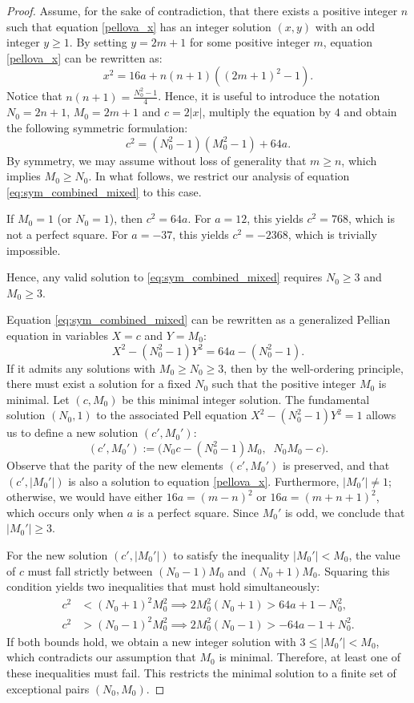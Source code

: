 \documentclass[10pt,a4paper]{amsart}
\begin{document}
\begin{proof}
Assume, for the sake of contradiction, that there exists a positive integer $n$ such that equation \eqref{pellova_x} has an integer solution $(x, y)$ with an odd integer $y \ge 1$. 
By setting $y = 2m+1$ for some positive integer $m$, equation \eqref{pellova_x} can be rewritten as:
$$ x^2 = 16a + n(n+1)((2m+1)^2-1). $$
Notice that $n(n+1) = \frac{N_0^2-1}{4}$. Hence, it is useful to introduce the notation $N_0 = 2n+1$, $M_0 = 2m+1$ and $c = 2|x|$, multiply the equation by $4$ and obtain the following symmetric formulation:
\begin{equation} \label{eq:sym_combined_mixed}
c^2 = (N_0^2-1)(M_0^2-1) + 64a.
\end{equation}
By symmetry, we may assume without loss of generality that $m \geq n$, which implies $M_0 \geq N_0$. In what follows, we restrict our analysis of equation \eqref{eq:sym_combined_mixed} to this case.

If $M_0 = 1$ (or $N_0 = 1$), then  $c^2 = 64a$. 
 For $a=12$, this yields $c^2 = 768$, which is not a perfect square.
    For $a=-37$, this yields $c^2 = -2368$, which is trivially impossible.

Hence, any valid solution to \eqref{eq:sym_combined_mixed} requires $N_0 \ge 3$ and $M_0 \ge 3$. 

Equation \eqref{eq:sym_combined_mixed} can be rewritten as a generalized Pellian equation in variables $X=c$ and $Y=M_0$:
$$ X^2 - (N_0^2-1)Y^2 = 64a - (N_0^2-1). $$
If it admits any solutions with $M_0 \ge N_0 \ge 3$, then by the well-ordering principle, there must exist a solution for a fixed $N_0$ such that the positive integer $M_0$ is minimal. 
Let $(c, M_0)$ be this minimal integer solution. The fundamental solution $(N_0, 1)$ to the associated Pell equation $X^2 - (N_0^2-1)Y^2 = 1$ allows us to define a new solution $(c', M_0')$:
$$ (c', M_0') := \bigl(N_0 c - (N_0^2-1)M_0,\;\; N_0 M_0 - c\bigr). $$
Observe that the parity of the new elements $(c', M_0')$ is preserved, and that $(c', |M_0'|)$ is also a solution to equation \eqref{pellova_x}. 
Furthermore, $|M_0'| \neq 1$; otherwise, we would have either $16a=(m-n)^2$ or $16a=(m+n+1)^2$, which occurs only when $a$ is a perfect square. Since $M_0'$ is odd, we conclude that $|M_0'| \ge 3$.

For the new solution $(c', |M_0'|)$ to satisfy the  inequality $|M_0'| < M_0$, the value of $c$ must fall strictly between $(N_0-1)M_0$ and $(N_0+1)M_0$. Squaring this condition yields two inequalities that must hold simultaneously:
\begin{align}
    c^2 &< (N_0+1)^2 M_0^2 \implies 2M_0^2(N_0+1) > 64a + 1 - N_0^2, \label{upper_bound} \\
    c^2 &> (N_0-1)^2 M_0^2 \implies 2M_0^2(N_0-1) > -64a - 1 + N_0^2. \label{lower_bound}
\end{align}
If both bounds hold, we obtain a new integer solution with $3 \le |M_0'| < M_0$, which contradicts our assumption that $M_0$ is minimal. Therefore,  at least one of these inequalities must fail. This restricts the minimal solution to a finite set of exceptional pairs $(N_0, M_0)$.



\end{proof}
\end{document}
